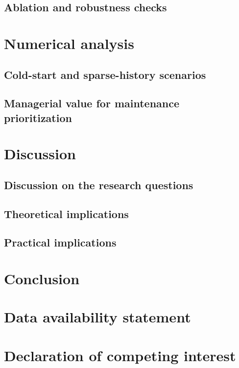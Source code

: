 \documentclass[authoryear,preprint,review,times,10pt]{elsarticle}
\begin{document}
\subsection{Ablation and robustness checks}

\section{Numerical analysis}
\subsection{Cold-start and sparse-history scenarios}

\subsection{Managerial value for maintenance prioritization}

\section{Discussion}
\subsection{Discussion on the research questions}

\subsection{Theoretical implications}

\subsection{Practical implications}


\section{Conclusion}

\section*{Data availability statement}

\section*{Declaration of competing interest}
\end{document}

